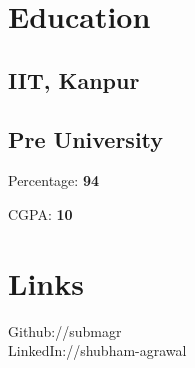 \documentclass[]{deedy-resume-openfont}
\begin{document}
%
%
\lastupdated

%
%



%
%

\begin{minipage}[t]{0.33\textwidth} 


\section{Education} 

\subsection{IIT, Kanpur}
\sectionsep

\subsection{Pre University}
Percentage: \textbf{94}

CGPA: \textbf{10}
\sectionsep



\section{Links} 
Github://submagr \href{https://github.com/submagr} \\
LinkedIn://shubham-agrawal \href{https://www.linkedin.com/in/shubham-agrawal-5b002ab2} \\
\sectionsep



\end{minipage}
\end{document}
